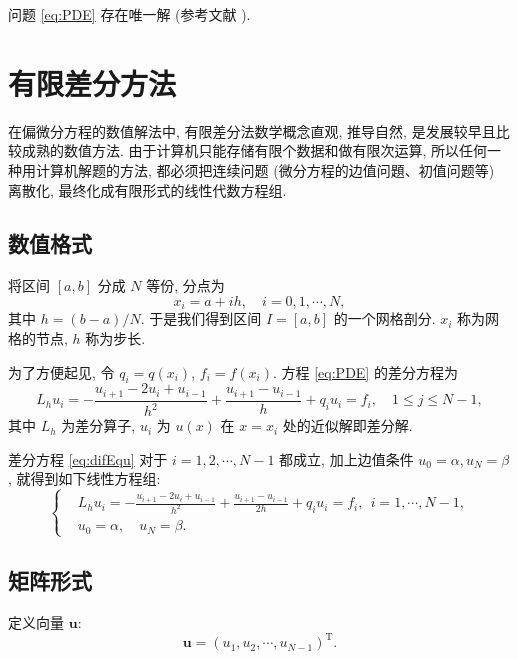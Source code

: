 \documentclass[UTF8,openany]{ctexbook}
\numberwithin{equation}{chapter}
\numberwithin{figure}{chapter}
\numberwithin{table}{chapter}
\theoremstyle{mystyle}
\begin{document}
问题 \eqref{eq:PDE} 存在唯一解 (参考文献 \cite{LiLiu1997}).


\section{有限差分方法}
在偏微分方程的数值解法中, 有限差分法数学概念直观, 推导自然, 是发展较早且比较成熟的数值方法. 由于计算机只能存储有限个数据和做有限次运算, 所以任何一种用计算机解题的方法, 都必须把连续问题 (微分方程的边值问題、初值问题等) 离散化, 最终化成有限形式的线性代数方程组.

\subsection{数值格式}
将区间 $[a,b]$ 分成 $N$ 等份, 分点为
\begin{equation*}
  x_{i} = a+ih, \quad i=0,1, \cdots, N,
\end{equation*}
其中 $h=(b-a)/N$. 于是我们得到区间 $I=[a,b]$ 的一个网格剖分. $x_i$ 称为网格的节点, $h$ 称为步长.

为了方便起见, 令 $q_{i}=q(x_{i})$, $f_{i}=f(x_{i})$. 方程 \eqref{eq:PDE} 的差分方程为
\begin{equation}\label{eq:difEqu}
  L_{h} u_{i}=-\frac{u_{i+1}-2 u_{i}+u_{i-1}}{h^{2}}+\frac{u_{i+1}-u_{i-1}}{h}+q_{i} u_{i}=f_{i},\quad 1 \leqslant j \leqslant N-1,
\end{equation}
其中 $L_{h}$ 为差分算子, $u_i$ 为 $u(x)$ 在 $x=x_i$ 处的近似解即差分解.

差分方程 \eqref{eq:difEqu} 对于 $i=1,2, \cdots, N-1$ 都成立, 加上边值条件 $u_{0}=\alpha, u_{N}=\beta$, 就得到如下线性方程组:
\begin{equation}\label{eq:fdm}
\left\{\begin{aligned}
& L_{h} u_{i}=-\frac{u_{i+1}-2 u_{i}+u_{i-1}}{h^{2}}+\frac{u_{i+1}-u_{i-1}}{2h}+q_{i} u_{i}=f_{i}, ~~ i=1, \cdots, N-1, \\
& u_{0}=\alpha, \quad u_{N}=\beta.
\end{aligned}\right.
\end{equation}


\subsection{矩阵形式}

定义向量 $\boldsymbol{u}$:
\begin{equation*}
  \boldsymbol{u}=(u_{1}, u_{2}, \cdots, u_{N-1})^{\mathrm{T}}.
\end{equation*}
\end{document}
